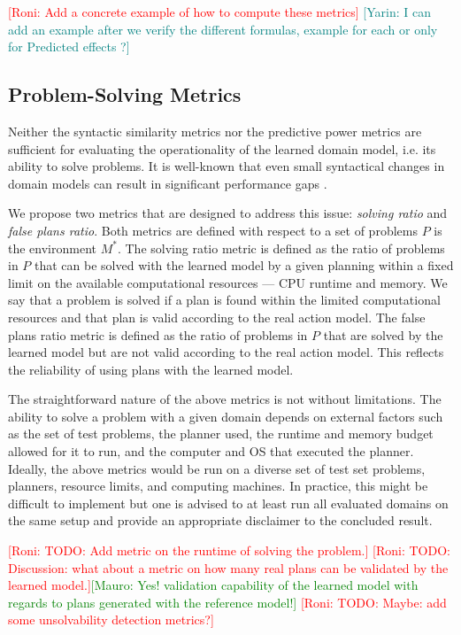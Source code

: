 \documentclass{article}
\theoremstyle{definition}
\theoremstyle{remark}
\newcommand{\realm}{\ensuremath{M^*}\xspace}
\newcommand{\roni}[1]{{\textcolor{red}{[Roni: #1]}}}
\newcommand{\mauro}[1]{{\textcolor{green}{[Mauro: #1]}}}
\newcommand{\yarin}[1]{{\textcolor{teal}{[Yarin: #1]}}}
\begin{document}
\roni{Add a concrete example of how to compute these metrics}
\yarin{I can add an example after we verify the different formulas, example for each or only for Predicted effects ?}


\subsection{Problem-Solving Metrics}
Neither the syntactic similarity metrics nor the predictive power metrics are sufficient for evaluating the operationality \citep{DBLP:conf/kcap/McCluskeyVV17} of the learned domain model, i.e. its ability to solve problems. It is well-known that even small syntactical changes in domain models can result in significant performance gaps \citep{DBLP:conf/kcap/VallatiC19,vallati2021importance}.

We propose two metrics that are designed to address this issue: \emph{solving ratio} and \emph{false plans ratio}. 
Both metrics are defined with respect to a set of problems $P$ is the environment $\realm$. 
The solving ratio metric is defined as the ratio of problems in $P$ that can be solved with the learned model by a given planning within a fixed limit on the available computational resources --- CPU runtime and memory. 
We say that a problem is solved if a plan is found within the limited computational resources and that plan is valid according to the real action model. 
The false plans ratio metric is defined as the ratio of problems in $P$ that are solved by the learned model but are not valid according to the real action model. This reflects the reliability of using plans with the learned model.

The straightforward nature of the above metrics is not without limitations. The ability to solve a problem with a given domain depends on external factors such as the set of test problems, the planner used, the runtime and memory budget allowed for it to run, and the computer and OS that executed the planner. Ideally, the above metrics would be run on a diverse set of test set problems, planners, resource limits, and computing machines. In practice, this might be difficult to implement but one is advised to at least run all evaluated domains on the same setup and provide an appropriate disclaimer to the concluded result. 

\roni{TODO: Add metric on the runtime of solving the problem.}
\roni{TODO: Discussion: what about a metric on how many real plans can be validated by the learned model.}\mauro{Yes! validation capability of the learned model with regards to plans generated with the reference model!}
\roni{TODO: Maybe: add some unsolvability detection metrics?}
\end{document}
